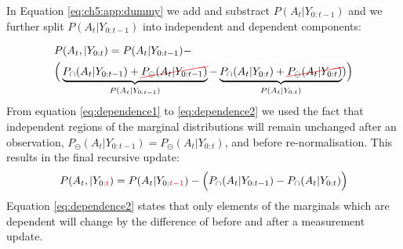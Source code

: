 In Equation \ref{eq:ch5:app:dummy} we add and substract $P(A_t|Y_{0:t-1})$ and we further split 
$P(A_t|Y_{0:t-1})$ into independent and dependent components: 

\begin{align}
  &P(A_t,|Y_{0:t}) =  P(A_t|Y_{0:t-1}) - \nonumber \\ 
  &\Big(\underbrace{P_{\cap}(A_t|Y_{0:t-1}) + \Ccancel[red]{P_{\ominus}(A_t|Y_{0:t-1})}}_{P(A_t|Y_{0:t-1})} -  \underbrace{P_{\cap}(A_t|Y_{0:t}) + \Ccancel[red]{P_{\ominus}(A_t|Y_{0:t})}}_{P(A_t|Y_{0:t})})   \Big) \label{eq:dependence1} 
\end{align}
From equation \ref{eq:dependence1} to \ref{eq:dependence2} we used the fact that independent regions of the marginal distributions will remain unchanged after
an observation, $P_{\ominus}(A_t|Y_{0:t-1}) = P_{\ominus}(A_t|Y_{0:t})$, and before re-normalisation. This results in the final recursive update:
\begin{equation}
 P(A_t,|Y_{0:\color{red}{t}}) =  P(A_t|Y_{0:\color{red}{t-1}}) - \Big(P_{\cap}(A_t|Y_{0:t-1}) -  P_{\cap}(A_t|Y_{0:t})  \Big) \label{eq:dependence2} 
\end{equation}
Equation \ref{eq:dependence2} states that only elements of the marginals which are dependent will change by the difference of before and after 
a measurement update.


